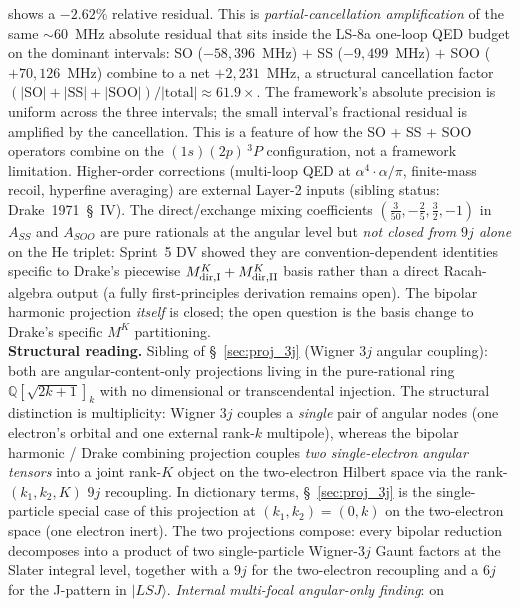 \documentclass[11pt]{article}
\begin{document}
shows a $-2.62\%$ relative residual.  This is \emph{partial-cancellation
amplification} of the same $\sim$$60$~MHz absolute residual that sits
inside the LS-8a one-loop QED budget on the dominant intervals: SO
($-58{,}396$~MHz) $+$ SS ($-9{,}499$~MHz) $+$ SOO ($+70{,}126$~MHz)
combine to a net $+2{,}231$~MHz, a structural cancellation factor
$(|\text{SO}|+|\text{SS}|+|\text{SOO}|) / |\text{total}| \approx 61.9\times$.
The framework's absolute precision is uniform across the three
intervals; the small interval's fractional residual is amplified by
the cancellation.  This is a feature of how the SO + SS + SOO
operators combine on the $(1s)(2p)\,{}^3\!P$ configuration, not a
framework limitation.  Higher-order corrections (multi-loop QED at
$\alpha^4 \cdot \alpha/\pi$, finite-mass recoil, hyperfine averaging)
are external Layer-2 inputs (sibling status: Drake~1971~\S~IV).
The direct/exchange mixing coefficients
$(\tfrac{3}{50}, -\tfrac{2}{5}, \tfrac{3}{2}, -1)$ in
$A_{SS}$ and $A_{SOO}$ are pure rationals at the angular level but
\emph{not closed from $9j$ alone} on the He triplet: Sprint~5 DV
showed they are convention-dependent identities specific to Drake's
piecewise $M^K_{\rm dir,I} + M^K_{\rm dir,II}$ basis rather than a
direct Racah-algebra output (a fully first-principles derivation
remains open).  The bipolar harmonic
projection \emph{itself} is closed; the open question is the basis
change to Drake's specific $M^K$ partitioning.\\
\textbf{Structural reading.}  Sibling of \S~\ref{sec:proj_3j}
(Wigner $3j$ angular coupling): both are angular-content-only
projections living in the pure-rational ring
$\mathbb{Q}[\sqrt{2k+1}]_{k}$ with no dimensional or transcendental
injection.  The structural distinction is multiplicity: Wigner $3j$
couples a \emph{single} pair of angular nodes (one electron's
orbital and one external rank-$k$ multipole), whereas the bipolar
harmonic / Drake combining projection couples \emph{two
single-electron angular tensors} into a joint rank-$K$ object on
the two-electron Hilbert space via the rank-$(k_1, k_2, K)$
$9j$ recoupling.  In dictionary terms, \S~\ref{sec:proj_3j} is
the single-particle special case of this projection at
$(k_1, k_2) = (0, k)$ on the two-electron space (one electron
inert).  The two projections compose: every bipolar reduction
decomposes into a product of two single-particle Wigner-$3j$ Gaunt
factors at the Slater integral level, together with a $9j$ for the
two-electron recoupling and a $6j$ for the J-pattern in
$|LSJ\rangle$.  \emph{Internal multi-focal angular-only finding}: on
$$
\end{document}
